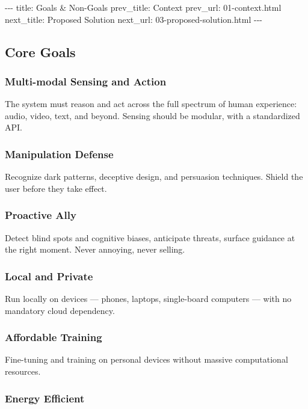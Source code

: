 \documentclass[12pt,a4paper]{article}
\begin{document}
-\/-\/- title: Goals \& Non-Goals prev\_title: Context prev\_url:
01-context.html next\_title: Proposed Solution next\_url:
03-proposed-solution.html -\/-\/-

\subsection{Core Goals}\label{core-goals}

\subsubsection{Multi-modal Sensing and
Action}\label{multi-modal-sensing-and-action}

The system must reason and act across the full spectrum of human
experience: audio, video, text, and beyond. Sensing should be modular,
with a standardized API.

\subsubsection{Manipulation Defense}\label{manipulation-defense}

Recognize dark patterns, deceptive design, and persuasion techniques.
Shield the user before they take effect.

\subsubsection{Proactive Ally}\label{proactive-ally}

Detect blind spots and cognitive biases, anticipate threats, surface
guidance at the right moment. Never annoying, never selling.

\subsubsection{Local and Private}\label{local-and-private}

Run locally on devices --- phones, laptops, single-board computers ---
with no mandatory cloud dependency.

\subsubsection{Affordable Training}\label{affordable-training}

Fine-tuning and training on personal devices without massive
computational resources.

\subsubsection{Energy Efficient}\label{energy-efficient}
\end{document}
